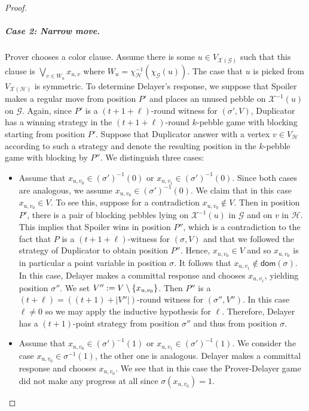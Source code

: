 \documentclass[a4paper,english, thm-restate]{lipics-v2021}
\DeclarePairedDelimiter\set{\lbrace}{\rbrace}
\newcommand{\inv}[1]{#1^{-1}}
\newcommand{\graphG}{\mathcal{G}}
\newcommand{\graphH}{\mathcal{H}}
\newcommand{\vertexH}{V_{\graphH}}
\newcommand{\coloringG}{\chi_{\graphG}}
\newcommand{\coloringH}{\chi_{\graphH}}
\newcommand{\dom}{\mathsf{dom}}
\newcommand{\graphXG}{\mathcal{X}(\mathcal{G})}
\newcommand{\graphXH}{\mathcal{X}(\mathcal{H})}
\newcommand{\vertexXG}{V_{\graphXG}}
\newcommand{\vertexXH}{V_{\graphXH}}
\newcommand{\X}{\mathcal{X}}
\newcommand{\XI}{\X^{-1}}
\begin{document}
\begin{proof}
\begin{claimproof}
\subparagraph{Case 2: Narrow move.}
Prover chooses a color clause.
Assume there is some $u \in \vertexXG$ such that
this clause is $\bigvee_{v \in W_u} x_{u,v}$ where $W_u = \inv{\coloringH}(\coloringG(u))$.
The case  that $u$ is picked from $\vertexXH$ is symmetric.
To determine Delayer's response, we suppose that Spoiler makes a regular move from position $P'$ and places an unused pebble on $\XI(u)$ on $\graphG$. Again, since $P'$ is a $(t+1+\ell)$-round witness for $(\sigma', V)$, Duplicator has a winning strategy in the $(t+1+\ell)$-round $k$-pebble game with blocking starting from position $P'$. Suppose that Duplicator answer with a vertex $v \in \vertexH$ according to such a strategy and denote the resulting position in the $k$-pebble game with blocking by $P''$. We distinguish three cases:
\begin{itemize}
        \item Assume that $x_{u, v_0} \in (\sigma')^{-1}(0)$ or $x_{u, v_1} \in (\sigma')^{-1}(0)$. Since both cases are analogous,
        we assume $x_{u, v_0} \in (\sigma')^{-1}(0)$.
        We claim that in this case $x_{u, v_0} \in V$.
        To see this, suppose for a contradiction $x_{u,v_0}\notin V$.
        Then in position $P'$, there is a pair of blocking pebbles lying on $\XI(u)$ in $\graphG$ and on $v$ in $\graphH$.
        This implies that Spoiler wins in position $P''$, which is a contradiction
        to the fact that $P$ is a $(t+1+\ell)$-witness for $(\sigma,V)$
        and that we followed the strategy of Duplicator to obtain position $P''$.
        Hence, $x_{u, v_0} \in V$ and so $x_{u, v_0}$ is in particular a point variable in position $\sigma$.
        It follows that $x_{u,v_1} \not\in \dom(\sigma)$. In this case, Delayer makes a committal response and chooses $x_{u,v_1}$, yielding position $\sigma''$.
        We set $V'' :=  V \setminus \set{x_{u, v_0}}$.
        Then $P''$ is a $(t+\ell) = ((t+1)+|V''|)$-round witness for $(\sigma'',V'')$. In this case $\ell \neq 0$ so we may apply the inductive hypothesis for $\ell$. Therefore, Delayer has a $(t+1)$-point strategy from position $\sigma''$ and thus from position $\sigma$.
        \item 
        Assume that $x_{u, v_0} \in (\sigma')^{-1}(1)$ or $x_{u, v_1} \in (\sigma')^{-1}(1)$.
        We consider the case $x_{u, v_0} \in \sigma^{-1}(1)$, the other one is analogous.
        Delayer makes a committal response and chooses $x_{u, v_0}$.
        We see that in this case the Prover-Delayer game did not make any progress at all since $\sigma(x_{u, v_0}) = 1$.

\end{itemize}
\end{claimproof}
\end{proof}
\end{document}
